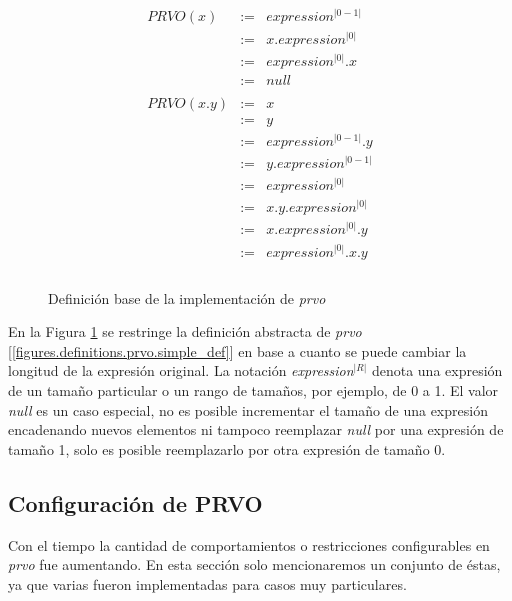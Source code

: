 \begin{figure}
	\begin{displaymath}
	\begin{array}{lll}
  PRVO(x)		& :=	& expression^{|0-1|} \\
  & := & x.expression^{|0|} \\
  & := & expression^{|0|}.x \\
  & := & null \\
	
  \\
  PRVO(x.y)	& :=	& x \\
  & :=	& 	y \\
  & :=	& expression^{|0-1|}.y \\
  & :=	& y.expression^{|0-1|} \\
  & :=	& expression^{|0|} \\
  & :=	& x.y.expression^{|0|} \\
  & :=	& x.expression^{|0|}.y \\
  & :=	& expression^{|0|}.x.y \\
  \\
	
	\end{array}
	\end{displaymath}
	\caption{Definici\'on base de la implementaci\'on de \emph{prvo}}
	\label{figures.definitions.prvo.impl_def}
\end{figure}

En la Figura \ref{figures.definitions.prvo.impl_def} se restringe la definici\'on abstracta de \emph{prvo} [\ref{figures.definitions.prvo.simple_def}] en base a cuanto se puede cambiar la longitud de la expresi\'on original. La notaci\'on \emph{expression$^{|R|}$} denota una expresi\'on de un tama\~no particular o un rango de tama\~nos, por ejemplo, de 0 a 1. El valor \emph{null} es un caso especial, no es posible incrementar el tama\~no de una expresi\'on encadenando nuevos elementos ni tampoco reemplazar \emph{null} por una expresi\'on de tama\~no 1, solo es posible reemplazarlo por otra expresi\'on de tama\~no 0.

\subsection{Configuraci\'on de PRVO}

Con el tiempo la cantidad de comportamientos o restricciones configurables en \emph{prvo} fue aumentando. En esta secci\'on solo mencionaremos un conjunto de \'estas, ya que varias fueron implementadas para casos muy particulares.

